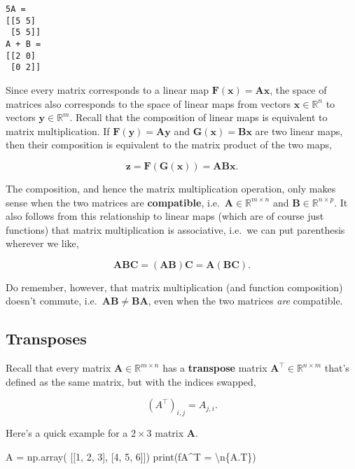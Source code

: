 \documentclass[
  letterpaper,
  DIV=11,
  numbers=noendperiod]{scrreprt}
\newenvironment{Shaded}{\begin{snugshade}}{\end{snugshade}}
\newcommand{\BuiltInTok}[1]{\textcolor[rgb]{0.00,0.23,0.31}{#1}}
\newcommand{\CharTok}[1]{\textcolor[rgb]{0.13,0.47,0.30}{#1}}
\newcommand{\DecValTok}[1]{\textcolor[rgb]{0.68,0.00,0.00}{#1}}
\newcommand{\NormalTok}[1]{\textcolor[rgb]{0.00,0.23,0.31}{#1}}
\newcommand{\OperatorTok}[1]{\textcolor[rgb]{0.37,0.37,0.37}{#1}}
\newcommand{\SpecialCharTok}[1]{\textcolor[rgb]{0.37,0.37,0.37}{#1}}
\newcommand{\SpecialStringTok}[1]{\textcolor[rgb]{0.13,0.47,0.30}{#1}}
\begin{document}
\begin{verbatim}
5A = 
[[5 5]
 [5 5]]
A + B = 
[[2 0]
 [0 2]]
\end{verbatim}

Since every matrix corresponds to a linear map
\(\mathbf{F}(\mathbf{x}) = \mathbf{A}\mathbf{x}\), the space of matrices
also corresponds to the space of linear maps from vectors
\(\mathbf{x} \in \mathbb{R}^n\) to vectors
\(\mathbf{y} \in \mathbb{R}^m\). Recall that the composition of linear
maps is equivalent to matrix multiplication. If
\(\mathbf{F}(\mathbf{y}) = \mathbf{A}\mathbf{y}\) and
\(\mathbf{G}(\mathbf{x}) = \mathbf{B}\mathbf{x}\) are two linear maps,
then their composition is equivalent to the matrix product of the two
maps,

\[\mathbf{z}=\mathbf{F}(\mathbf{G}(\mathbf{x})) = \mathbf{A}\mathbf{B}\mathbf{x}.\]

The composition, and hence the matrix multiplication operation, only
makes sense when the two matrices are \textbf{compatible},
i.e.~\(\mathbf{A} \in \mathbb{R}^{m \times n}\) and
\(\mathbf{B} \in \mathbb{R}^{n \times p}\). It also follows from this
relationship to linear maps (which are of course just functions) that
matrix multiplication is associative, i.e.~we can put parenthesis
wherever we like,

\[\mathbf{A}\mathbf{B}\mathbf{C} = (\mathbf{A}\mathbf{B})\mathbf{C} = \mathbf{A}(\mathbf{B}\mathbf{C}).\]

Do remember, however, that matrix multiplication (and function
composition) doesn't commute,
i.e.~\(\mathbf{A}\mathbf{B} \neq \mathbf{B}\mathbf{A}\), even when the
two matrices \emph{are} compatible.

\hypertarget{transposes}{%
\subsection{Transposes}\label{transposes}}

Recall that every matrix \(\mathbf{A} \in \mathbb{R}^{m \times n}\) has
a \textbf{transpose} matrix
\(\mathbf{A}^\top \in \mathbb{R}^{n \times m}\) that's defined as the
same matrix, but with the indices swapped,

\[(A^\top)_{i,j} = A_{j,i}.\]

Here's a quick example for a \(2 \times 3\) matrix \(\mathbf{A}\).

\begin{Shaded}
\begin{Highlighting}[]
\NormalTok{A }\OperatorTok{=}\NormalTok{ np.array(}
\NormalTok{    [[}\DecValTok{1}\NormalTok{, }\DecValTok{2}\NormalTok{, }\DecValTok{3}\NormalTok{], }
\NormalTok{     [}\DecValTok{4}\NormalTok{, }\DecValTok{5}\NormalTok{, }\DecValTok{6}\NormalTok{]])}
\BuiltInTok{print}\NormalTok{(}\SpecialStringTok{f\textquotesingle{}A\^{}T = }\CharTok{\textbackslash{}n}\SpecialCharTok{\{}\NormalTok{A}\SpecialCharTok{.}\NormalTok{T}\SpecialCharTok{\}}\SpecialStringTok{\textquotesingle{}}\NormalTok{)}
\end{Highlighting}
\end{Shaded}
\end{document}
